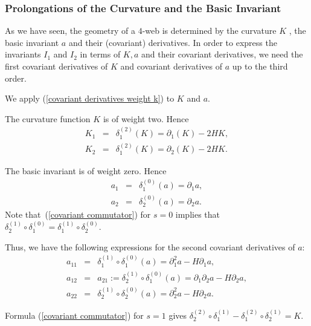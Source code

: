 \documentclass{article}
\begin{document}
\subsubsection{Prolongations of the Curvature and the Basic Invariant}

As we have seen, the geometry of a $4$-web is determined by the curvature $K$%
, the basic invariant $a$ and their (covariant) derivatives. In order to
express the invariants $I_{1}$ and $I_{2}$ in terms of $K,a$ and their
covariant derivatives, we need the first covariant derivatives of $K$ and
covariant derivatives of $a$ up to the third order.

We apply (\ref{covariant derivatives weight k}) to $K$ and $a.$

The curvature function $K$ is of weight two. Hence
\begin{eqnarray*}
K_{1} &\!\!\!\!=&\!\!\!\!\delta _{1}^{\left( 2\right) }\left( K\right)
=\partial _{1}\left( K\right) -2HK, \\
K_{2} &\!\!\!\!=&\!\!\!\!\delta _{1}^{\left( 2\right) }\left( K\right)
=\partial _{2}\left( K\right) -2HK.
\end{eqnarray*}

The basic invariant is of weight zero$.$ Hence
\begin{eqnarray*}
a_{1} &\!\!\!\!=&\!\!\!\!\delta _{1}^{\left( 0\right) }\left( a\right)
=\partial _{1}a, \\
a_{2} &\!\!\!\!=&\!\!\!\!\delta _{2}^{\left( 0\right) }\left( a\right)
=\partial _{2}a.
\end{eqnarray*}%
Note that\ (\ref{covariant commutator}) for $s=0$ implies that $\delta
_{2}^{\left( 1\right) }\circ \delta _{1}^{\left( 0\right) }=\delta
_{1}^{\left( 1\right) }\circ \delta _{2}^{\left( 0\right) }.$

Thus, we have the following expressions for the second covariant derivatives
of $a:$%
\begin{eqnarray*}
a_{11} &\!\!\!\!=&\!\!\!\!\delta _{1}^{\left( 1\right) }\circ \delta
_{1}^{\left( 0\right) }(a)=\partial _{1}^{2}a-H\partial _{1}a, \\
a_{12} &\!\!\!\!=&\!\!\!\!a_{21}:=\delta _{2}^{\left( 1\right) }\circ \delta
_{1}^{\left( 0\right) }(a)=\partial _{1}\partial _{2}a-H\partial _{2}a, \\
a_{22} &\!\!\!\!=&\!\!\!\!\delta _{2}^{\left( 1\right) }\circ \delta
_{2}^{\left( 0\right) }(a)=\partial _{2}^{2}a-H\partial _{2}a.
\end{eqnarray*}

Formula (\ref{covariant commutator}) for $s=1$ gives $\delta _{2}^{\left(
2\right) }\circ \delta _{1}^{\left( 1\right) }-\delta _{1}^{\left( 2\right)
}\circ \delta _{2}^{\left( 1\right) }=K.$
\end{document}
